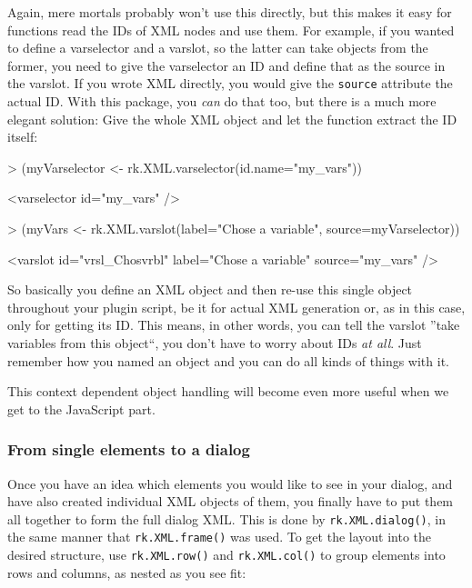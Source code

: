 \documentclass[a4paper,10pt]{scrartcl}
\begin{document}
Again, mere mortals probably won't use this directly, but this makes it easy for functions read the IDs of XML nodes and use them. For example,
if you wanted to define a varselector and a varslot, so the latter can take objects from the former, you need to give the varselector an ID and
define that as the source in the varslot. If you wrote XML directly, you would give the \texttt{source} attribute the actual ID. With this package,
you \textit{can} do that too, but there is a much more elegant solution: Give the whole XML object and let the function extract the ID itself:

	\begin{Schunk}
		\begin{Sinput}
> (myVarselector <- rk.XML.varselector(id.name="my_vars"))
		\end{Sinput}
		\begin{Soutput}
<varselector id="my_vars" />
		\end{Soutput}
		\begin{Sinput}
> (myVars <- rk.XML.varslot(label="Chose a variable", source=myVarselector))
		\end{Sinput}
		\begin{Soutput}
<varslot id="vrsl_Chosvrbl" label="Chose a variable" source="my_vars" />
		\end{Soutput}
	\end{Schunk}

So basically you define an XML object and then re-use this single object throughout your plugin script, be it for actual XML generation or, as
in this case, only for getting its ID. This means, in other words, you can tell the varslot ''take variables from this object``, you don't have
to worry about IDs \textit{at all}. Just remember how you named an object and you can do all kinds of things with it.

This context dependent object handling will become even more useful when we get to the JavaScript part.

\subsubsection{From single elements to a dialog}
Once you have an idea which elements you would like to see in your dialog, and have also created individual XML objects of them, you finally have to
put them all together to form the full dialog XML. This is done by \texttt{rk.XML.dialog()}, in the same manner that \texttt{rk.XML.frame()} was used.
To get the layout into the desired structure, use \texttt{rk.XML.row()} and \texttt{rk.XML.col()} to group elements into rows and columns, as nested
as you see fit:
\end{document}
